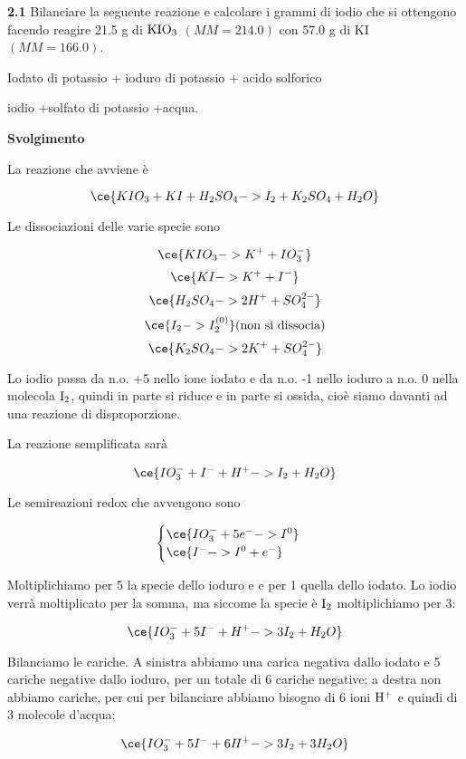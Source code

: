 \vspace{0.2cm}\textbf{2.1} Bilanciare la  seguente reazione e calcolare i grammi di iodio che si ottengono facendo reagire 21.5 g di $\rm KIO_3$ $(MM=214.0)$ con 57.0 g di KI $(MM=166.0)$.

\vspace{0.2cm}
\begin{center}Iodato di potassio + ioduro di potassio + acido solforico \ce{->}

\ce{->}iodio +solfato di potassio +acqua. 
\end{center}

\large\textbf{Svolgimento}\normalsize

\vspace{0.2cm}La reazione che avviene è

$$\ce{KIO_3 + KI + H_2SO_4 -> I_2 + K_2SO_4 + H_2O}$$

Le dissociazioni delle varie specie sono

$$\ce{KIO_3 -> K^+ + IO_3^-}$$
$$\ce{KI -> K^+ + I^-}$$
$$\ce{H_2SO_4 -> 2H^+ + SO_4^{2-}}$$
$$\ce{I_2 -> I_2^{(0)}}\text{(non si dissocia)}$$
$$\ce{K_2SO_4 -> 2K^+ + SO_4^{2-}}$$

Lo iodio passa da n.o. +5 nello ione iodato e da n.o. -1 nello ioduro a n.o. 0 nella molecola $\rm I_2$, quindi in parte si riduce e in parte si ossida, cioè siamo davanti ad una reazione di disproporzione.

La reazione semplificata sarà

$$\ce{IO_3^- + I^- + H^+ -> I_2 + H_2O}$$

Le semireazioni redox che avvengono sono 

$$\begin{cases}
    \ce{IO_3^- + 5e^-  -> I^0}\\
    \ce{I^- -> I^0 + e^-}
\end{cases}$$

Moltiplichiamo per 5 la specie dello ioduro e e per 1 quella dello iodato. Lo iodio verrà moltiplicato per la somma, ma siccome la specie è $\rm I_2$ moltiplichiamo per 3:

$$\ce{IO_3^- + 5I^- + H^+ -> 3I_2 + H_2O}$$

Bilanciamo le cariche. A sinistra abbiamo una carica negativa dallo iodato e 5 cariche negative dallo ioduro, per un totale di 6 cariche negative; a destra non abbiamo cariche, per cui per bilanciare abbiamo bisogno di 6 ioni $\rm H^+$ e quindi di 3 molecole d'acqua:

$$\ce{IO_3^- + 5I^- + 6H^+ -> 3I_2 + 3H_2O}$$

